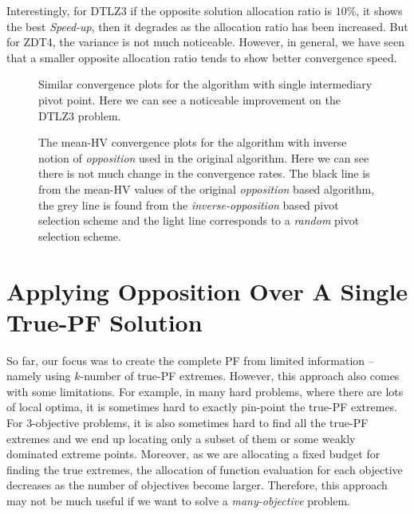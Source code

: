 \documentclass[journal]{IEEEtran}
\let\MYoriglatexcaption\caption
\renewcommand{\caption}[2][\relax]{\MYoriglatexcaption[#2]{#2}}
\begin{document}
Interestingly, for DTLZ3 if the opposite solution allocation ratio is \(10\%\), it shows the best \textit{Speed-up}, then it degrades as the allocation ratio has been increased. But for ZDT4, the variance is not much noticeable. However, in general, we have seen that a smaller opposite allocation ratio tends to show better convergence speed.\vfill \eject

%
\begin{figure*}[!htp]
	\centering
	\hfill
	\caption{Similar convergence plots for the algorithm with single intermediary pivot point. Here we can see a noticeable improvement on the DTLZ3 problem.}
	\label{plot:single-pf}
\end{figure*}
%
%
\begin{figure*}[!htb]
	\centering
	\hfill
	\caption{The mean-HV convergence plots for the algorithm with inverse notion of \textit{opposition} used in the original algorithm. Here we can see there is not much change in the convergence rates. The black line is from the mean-HV values of the original \textit{opposition} based algorithm, the grey line is found from the \textit{inverse-opposition} based pivot selection scheme and the light line corresponds to a \textit{random} pivot selection scheme.}
	\label{plot:opschemes}
\end{figure*}
%
\section{Applying Opposition Over A Single True-PF Solution}
\label{sec:single-pf}
So far, our focus was to create the complete PF from limited information -- namely using \(k\)-number of true-PF extremes. However, this approach also comes with some limitations. For example, in many hard problems, where there are lots of local optima, it is sometimes hard to exactly pin-point the true-PF extremes. For 3-objective problems, it is also sometimes hard to find all the true-PF extremes and we end up locating only a subset of them or some weakly dominated extreme points. Moreover, as we are allocating a fixed budget for finding the true extremes, the allocation of function evaluation for each objective decreases as the number of objectives become larger. Therefore, this approach may not be much useful if we want to solve a \textit{many-objective} problem.
\end{document}
